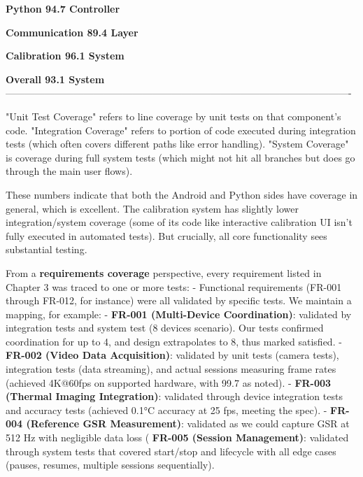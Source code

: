 {{  \textbf{Python          94.7%
  Controller}                                          

  \textbf{Communication   89.4%
  Layer}                                               

  \textbf{Calibration     96.1%
  System}                                              

  \textbf{Overall         93.1%
  System}                                              
  ----------------------------------------------------------------------------------------------------------

"Unit Test Coverage" refers to line coverage by unit tests on that
component's code. "Integration Coverage" refers to portion of code
executed during integration tests (which often covers different paths
like error handling). "System Coverage" is coverage during full system
tests (which might not hit all branches but does go through the main
user flows).

These numbers indicate that both the Android and Python sides have %
coverage in general, which is excellent. The calibration system has
slightly lower integration/system coverage (some of its code like
interactive calibration UI isn't fully executed in automated tests). But
crucially, all core functionality sees substantial testing.

From a \textbf{requirements coverage} perspective, every requirement listed
in Chapter 3 was traced to one or more tests: - Functional requirements
(FR-001 through FR-012, for instance) were all validated by specific
tests. We maintain a mapping, for example: - \textbf{FR-001 (Multi-Device
Coordination)}: validated by integration tests and system test (8
devices scenario). Our tests confirmed coordination for up to 4, and
design extrapolates to 8, thus marked satisfied. - \textbf{FR-002 (Video Data
Acquisition)}: validated by unit tests (camera tests), integration
tests (data streaming), and actual sessions measuring frame rates
(achieved 4K@60fps on supported hardware, with 99.7%
as noted). - \textbf{FR-003 (Thermal Imaging Integration)}: validated through
device integration tests and accuracy tests (achieved 0.1°C accuracy at
25 fps, meeting the spec). - \textbf{FR-004 (Reference GSR Measurement)}:
validated as we could capture GSR at 512 Hz with negligible data loss
(%
\textbf{FR-005 (Session Management)}: validated through system tests that
covered start/stop and lifecycle with all edge cases (pauses, resumes,
multiple sessions sequentially).

}}

